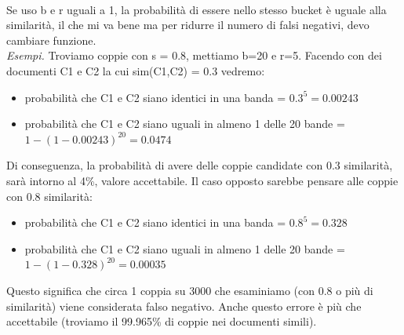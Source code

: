 \\
Se uso b e r uguali a 1, la probabilità di essere nello stesso bucket è uguale alla similarità, il che mi va bene ma per ridurre il numero di falsi negativi, devo cambiare funzione. 
\\
\textit{Esempi.} Troviamo coppie con s = 0.8, mettiamo b=20 e r=5. Facendo con dei documenti C1 e C2 la cui sim(C1,C2) = 0.3 vedremo:
\begin{itemize}
    \item probabilità che C1 e C2 siano identici in una banda = $0.3^5 = 0.00243$
    \item probabilità che C1 e C2 siano uguali in almeno 1 delle 20 bande = $1-(1-0.00243)^{20} = 0.0474$
\end{itemize}
Di conseguenza, la probabilità di avere delle coppie candidate con 0.3 similarità, sarà intorno al 4\%, valore accettabile. Il caso opposto sarebbe pensare alle coppie con 0.8 similarità: 
\begin{itemize}
    \item probabilità che C1 e C2 siano identici in una banda = $0.8^5 = 0.328$
    \item probabilità che C1 e C2 siano uguali in almeno 1 delle 20 bande = $1-(1-0.328)^{20} = 0.00035$ 
\end{itemize}
Questo significa che circa 1 coppia su 3000 che esaminiamo (con 0.8 o più di similarità) viene considerata falso negativo. Anche questo errore è più che accettabile (troviamo il 99.965\% di coppie nei documenti simili).
